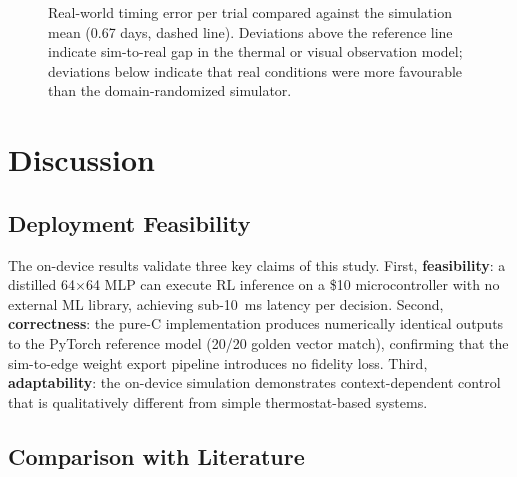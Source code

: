     \begin{figure}[H]
        \centering
        \caption{Real-world timing error per trial compared against the simulation mean (0.67 days, dashed line). Deviations above the reference line indicate sim-to-real gap in the thermal or visual observation model; deviations below indicate that real conditions were more favourable than the domain-randomized simulator.}
        \label{fig:real_timing_error}
    \end{figure}



\section{Discussion}
    \label{sec:Discussion}

    \subsection{Deployment Feasibility}

    The on-device results validate three key claims of this study. First, \textbf{feasibility}: a distilled 64$\times$64 MLP can execute RL inference on a \$10 microcontroller with no external ML library, achieving sub-10~ms latency per decision. Second, \textbf{correctness}: the pure-C implementation produces numerically identical outputs to the PyTorch reference model (20/20 golden vector match), confirming that the sim-to-edge weight export pipeline introduces no fidelity loss. Third, \textbf{adaptability}: the on-device simulation demonstrates context-dependent control that is qualitatively different from simple thermostat-based systems.

    \subsection{Comparison with Literature}

